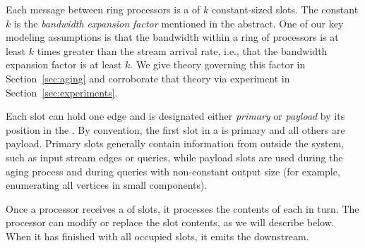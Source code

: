 Each message between ring processors is a \bundle of $k$ constant-sized slots. 
The constant $k$ is the \emph{bandwidth expansion factor}
mentioned in the abstract.  One of our key modeling assumptions is that
the bandwidth within a ring of processors is at least $k$ times greater than
the stream arrival rate, i.e., that the bandwidth expansion factor is at 
least $k$.  We give theory governing this factor in Section~\ref{sec:aging} 
and corroborate that theory via experiment in
Section~\ref{sec:experiments}.

Each slot can hold one edge and is
designated 
either \emph{primary} or \emph{payload} by its position in the \bundlens.  
By convention, the first slot in a \bundle is primary and all others are payload.
Primary slots generally contain information from outside the system, such as
input stream edges or queries, while payload slots are
used during the aging process and during queries with non-constant output
size (for example, enumerating all vertices in small components).

Once a processor receives a \bundle of slots, it processes the contents of each in turn. 
The processor can modify or replace the slot contents, as we will describe
below. When it has finished with all occupied slots, it emits the \bundle 
downstream. 


